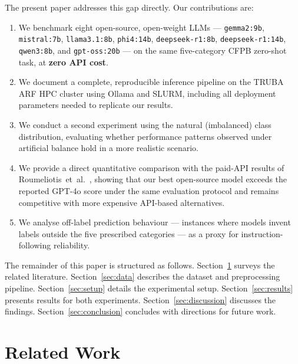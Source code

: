 \documentclass[journal]{IEEEtran}
\begin{document}
The present paper addresses this gap directly. Our contributions are:

\begin{enumerate}
  \item We benchmark eight open-source, open-weight LLMs —
        \texttt{gemma2:9b}, \texttt{mistral:7b}, \texttt{llama3.1:8b},
        \texttt{phi4:14b}, \texttt{deepseek-r1:8b},
        \texttt{deepseek-r1:14b}, \texttt{qwen3:8b}, and
        \texttt{gpt-oss:20b} — on the same five-category CFPB
        zero-shot task, at \textbf{zero API cost}.

  \item We document a complete, reproducible inference pipeline on the
        TRUBA ARF HPC cluster using Ollama and SLURM, including
        all deployment parameters needed to replicate our results.

  \item We conduct a second experiment using the natural (imbalanced)
        class distribution, evaluating whether performance patterns
        observed under artificial balance hold in a more realistic
        scenario.

  \item We provide a direct quantitative comparison with the paid-API
        results of Roumeliotis~et~al.\ \cite{roumeliotis2025think},
        showing that our best open-source model exceeds the reported
        GPT-4o score under the same evaluation protocol and remains
        competitive with more expensive API-based alternatives.

  \item We analyse off-label prediction behaviour — instances where
        models invent labels outside the five prescribed categories —
        as a proxy for instruction-following reliability.
\end{enumerate}

The remainder of this paper is structured as follows.
Section~\ref{sec:related} surveys the related literature.
Section~\ref{sec:data} describes the dataset and preprocessing
pipeline. Section~\ref{sec:setup} details the experimental setup.
Section~\ref{sec:results} presents results for both experiments.
Section~\ref{sec:discussion} discusses the findings.
Section~\ref{sec:conclusion} concludes with directions for future work.


\section{Related Work}
\label{sec:related}
\end{document}
